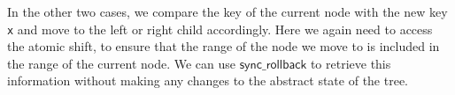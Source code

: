 \documentclass[acmsmall,screen]{acmart}\settopmatter{printfolios=true}
\begin{document}
In the other two cases, we compare the key
of the current node with the new key \texttt{x} and move to the left or right child accordingly. Here we again need to access the atomic shift, to ensure that the range of the node we move to is included in the range of the current node. We can use $\mathsf{sync\_rollback}$ to retrieve this information without making any changes to the abstract state of the tree. %
  
\end{document}
